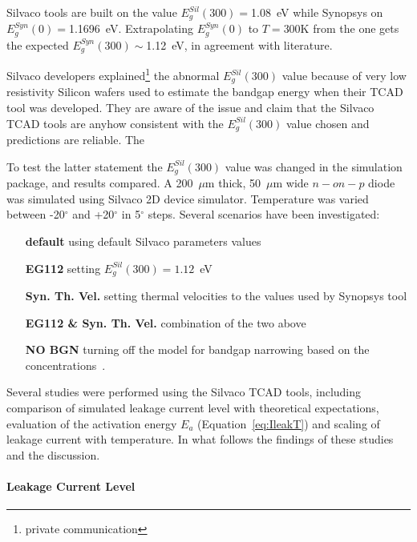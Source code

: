 Silvaco tools are built on the value $E^{Sil}_g(300)=$1.08~eV while Synopsys on $E^{Syn}_g(0)=$1.1696~eV. 
Extrapolating $E_g^{Syn}(0)$ to $T=$300K from the one gets the expected 
$E_g^{Syn}(300)\sim$1.12~eV, in agreement with literature.

Silvaco developers explained\footnote{private communication} the abnormal $E^{Sil}_g(300)$ value 
because of very low resistivity 
Silicon wafers used to estimate the bandgap energy when their TCAD tool was developed. 
They are aware of the issue and claim that the Silvaco TCAD tools are anyhow consistent with 
the $E^{Sil}_g(300)$ value chosen and predictions are reliable. The 

To test the latter statement the $E^{Sil}_g(300)$ value was changed in the simulation package, 
and results compared. 
A 200~$\mu$m thick, 50~$\mu$m wide $n-on-p$ diode was simulated using Silvaco 2D device 
simulator. Temperature was varied between -20$^{\circ}$ and +20$^{\circ}$ in 5$^{\circ}$ steps. 
Several scenarios have been investigated:

\begin{center}
\begin{varwidth}{\textwidth}
\begin{itemize}
\item[\bf default] using default Silvaco parameters values
\item[\bf EG112] setting $E^{Sil}_g(300)=1.12$~eV
\item[\bf Syn. Th. Vel.] setting thermal velocities to the values used by Synopsys tool
\item[\bf EG112 \& Syn. Th. Vel.] combination of the two above 
\item[\bf NO BGN] turning off the model for bandgap narrowing based on the concentrations~\cite{SLOTBOOM1977279}.
\end{itemize}
\end{varwidth}
\end{center}

Several studies were performed using the Silvaco TCAD tools,
 including comparison of simulated leakage current level with 
theoretical expectations,  evaluation of the activation energy $E_{a}$ (Equation~\ref{eq:IleakT}) 
and scaling of leakage current with temperature. In what follows the findings of these 
studies and the discussion.

\paragraph{Leakage Current Level}




